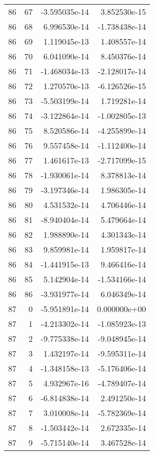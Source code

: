 \begin{tabular}{rrrr}
  86 &   67 & -3.595035e-14 &  3.852530e-15 \\
  86 &   68 &  6.996530e-14 & -1.738438e-14 \\
  86 &   69 &  1.119045e-13 &  1.408557e-14 \\
  86 &   70 &  6.041090e-14 &  8.450376e-14 \\
  86 &   71 & -1.468034e-13 & -2.128017e-14 \\
  86 &   72 &  1.270570e-13 & -6.126526e-15 \\
  86 &   73 & -5.503199e-14 &  1.719281e-14 \\
  86 &   74 & -3.122864e-14 & -1.002805e-13 \\
  86 &   75 &  8.520586e-14 & -4.255899e-14 \\
  86 &   76 &  9.557458e-14 & -1.112400e-14 \\
  86 &   77 &  1.461617e-13 & -2.717099e-15 \\
  86 &   78 & -1.930061e-14 &  8.378813e-14 \\
  86 &   79 & -3.197346e-14 &  1.986305e-14 \\
  86 &   80 &  4.531532e-14 &  4.706446e-14 \\
  86 &   81 & -8.940404e-14 &  5.479664e-14 \\
  86 &   82 &  1.988890e-14 &  4.301343e-14 \\
  86 &   83 &  9.859981e-14 &  1.959817e-14 \\
  86 &   84 & -1.441915e-13 &  9.466416e-14 \\
  86 &   85 &  5.142904e-14 & -1.534166e-14 \\
  86 &   86 & -3.931977e-14 &  6.046349e-14 \\
  87 &    0 & -5.951891e-14 &  0.000000e+00 \\
  87 &    1 & -4.213302e-14 & -1.085923e-13 \\
  87 &    2 & -9.775338e-14 & -9.048945e-14 \\
  87 &    3 &  1.432197e-14 & -9.595311e-14 \\
  87 &    4 & -1.348158e-13 & -5.176406e-14 \\
  87 &    5 &  4.932967e-16 & -4.789407e-14 \\
  87 &    6 & -6.814838e-14 &  2.491250e-14 \\
  87 &    7 &  3.010008e-14 & -5.782369e-14 \\
  87 &    8 & -1.503442e-14 &  2.672335e-14 \\
  87 &    9 & -5.715140e-14 &  3.467528e-14 \\

\end{tabular}
